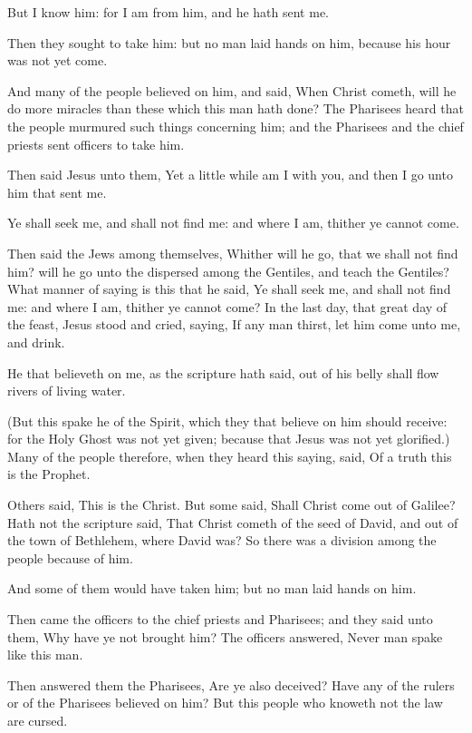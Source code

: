 \Verse But I know him: for I am from him, and he hath sent me.

\Verse Then they sought to take him: but no man laid hands on him, because his hour was not yet come.

\Verse And many of the people believed on him, and said, When Christ cometh, will he do more miracles than these which this man hath done?  \Verse The Pharisees heard that the people murmured such things concerning him; and the Pharisees and the chief priests sent officers to take him.

\Verse Then said Jesus unto them, Yet a little while am I with you, and then I go unto him that sent me.

\Verse Ye shall seek me, and shall not find me: and where I am, thither ye cannot come.

\Verse Then said the Jews among themselves, Whither will he go, that we shall not find him? will he go unto the dispersed among the Gentiles, and teach the Gentiles?  \Verse What manner of saying is this that he said, Ye shall seek me, and shall not find me: and where I am, thither ye cannot come?  \Verse In the last day, that great day of the feast, Jesus stood and cried, saying, If any man thirst, let him come unto me, and drink.

\Verse He that believeth on me, as the scripture hath said, out of his belly shall flow rivers of living water.

\Verse (But this spake he of the Spirit, which they that believe on him should receive: for the Holy Ghost was not yet given; because that Jesus was not yet glorified.)  \Verse Many of the people therefore, when they heard this saying, said, Of a truth this is the Prophet.

\Verse Others said, This is the Christ. But some said, Shall Christ come out of Galilee?  \Verse Hath not the scripture said, That Christ cometh of the seed of David, and out of the town of Bethlehem, where David was?  \Verse So there was a division among the people because of him.

\Verse And some of them would have taken him; but no man laid hands on him.

\Verse Then came the officers to the chief priests and Pharisees; and they said unto them, Why have ye not brought him?  \Verse The officers answered, Never man spake like this man.

\Verse Then answered them the Pharisees, Are ye also deceived?  \Verse Have any of the rulers or of the Pharisees believed on him?  \Verse But this people who knoweth not the law are cursed.

